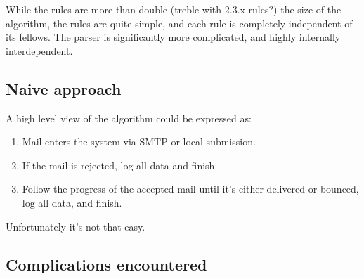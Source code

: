 \documentclass[a4paper,12pt,draft]{article}
\begin{document}
While the rules are more than double (treble with 2.3.x rules?) the size of
the algorithm, the rules are quite simple, and each rule is completely
independent of its fellows.  The parser is significantly more complicated,
and highly internally interdependent.


\subsection{Naive approach}

A high level view of the algorithm could be expressed as:

\begin{enumerate}

    \item Mail enters the system via SMTP or local submission.

    \item If the mail is rejected, log all data and finish.

    \item Follow the progress of the accepted mail until it's either delivered or
        bounced, log all data, and finish.

\end{enumerate}

Unfortunately it's not that easy.


\subsection{Complications encountered}
\end{document}
